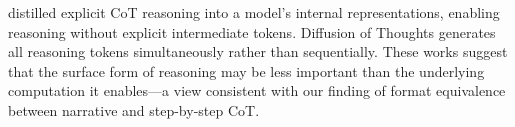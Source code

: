  \citet{deng2023implicit} distilled explicit CoT reasoning into a model's internal representations, enabling reasoning without explicit intermediate tokens. Diffusion of Thoughts \citep{ye2024diffusion} generates all reasoning tokens simultaneously rather than sequentially. These works suggest that the surface form of reasoning may be less important than the underlying computation it enables---a view consistent with our finding of format equivalence between narrative and step-by-step CoT.
